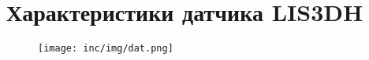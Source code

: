\chapter{Характеристики датчика LIS3DH}
\label{cha:appendix6}

\begin{figure}
\centering
\texttt{[image: inc/img/dat.png]}
\end{figure}

